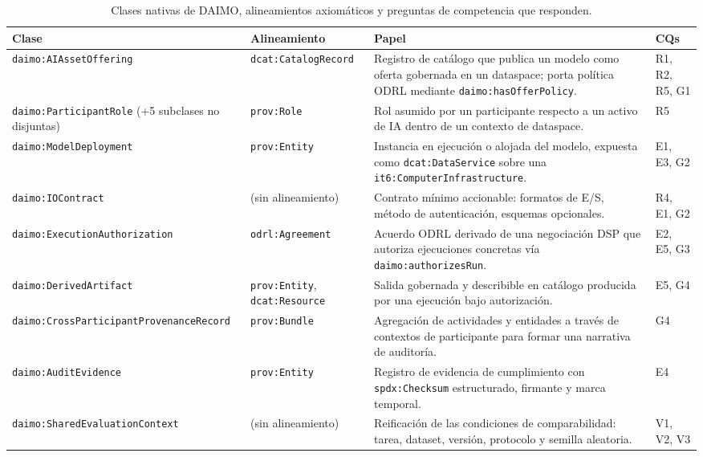 \documentclass[Afour,sagev,times]{sagej}
\newcommand{\code}[1]{\texttt{#1}}
\begin{document}
\begin{table}[t]
\small\sf\centering
\caption{Clases nativas de DAIMO, alineamientos axiomáticos y preguntas de competencia que responden.\label{tab:classes}}
\begin{tabular}{@{}p{4cm}p{3cm}p{6cm}p{2.2cm}@{}}
\toprule
\textbf{Clase} & \textbf{Alineamiento} & \textbf{Papel} & \textbf{CQs} \\
\midrule
\code{daimo:AIAssetOffering} & \code{dcat:CatalogRecord} & Registro de catálogo que publica un modelo como oferta gobernada en un dataspace; porta política ODRL mediante \code{daimo:hasOfferPolicy}. & R1, R2, R5, G1 \\
\code{daimo:ParticipantRole} \newline (+5 subclases no disjuntas) & \code{prov:Role} & Rol asumido por un participante respecto a un activo de IA dentro de un contexto de dataspace. & R5 \\
\code{daimo:ModelDeployment} & \code{prov:Entity} & Instancia en ejecución o alojada del modelo, expuesta como \code{dcat:DataService} sobre una \code{it6:ComputerInfrastructure}. & E1, E3, G2 \\
\code{daimo:IOContract} & (sin alineamiento) & Contrato mínimo accionable: formatos de E/S, método de autenticación, esquemas opcionales. & R4, E1, G2 \\
\code{daimo:ExecutionAuthorization} & \code{odrl:Agreement} & Acuerdo ODRL derivado de una negociación DSP que autoriza ejecuciones concretas vía \code{daimo:authorizesRun}. & E2, E5, G3 \\
\code{daimo:DerivedArtifact} & \code{prov:Entity}, \code{dcat:Resource} & Salida gobernada y describible en catálogo producida por una ejecución bajo autorización. & E5, G4 \\
\code{daimo:CrossParticipantProvenanceRecord} & \code{prov:Bundle} & Agregación de actividades y entidades a través de contextos de participante para formar una narrativa de auditoría. & G4 \\
\code{daimo:AuditEvidence} & \code{prov:Entity} & Registro de evidencia de cumplimiento con \code{spdx:Checksum} estructurado, firmante y marca temporal. & E4 \\
\code{daimo:SharedEvaluationContext} & (sin alineamiento) & Reificación de las condiciones de comparabilidad: tarea, dataset, versión, protocolo y semilla aleatoria. & V1, V2, V3 \\
\bottomrule
\end{tabular}
\end{table}
\end{document}
